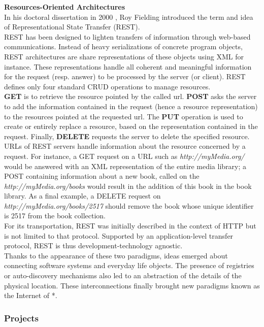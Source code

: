 {\bf Resources-Oriented Architectures}\\

In his doctoral dissertation in 2000 \cite{Fielding:2000}, Roy Fielding introduced the term and idea of Representational State Transfer (REST).\\
REST has been designed to lighten transfers of information through web-based communications. Instead of heavy serializations of concrete program objects, REST architectures are share representations of these objects using XML for instance. These representations handle all coherent and meaningful information for the request (resp. answer) to be processed by the server (or client). REST defines only four standard CRUD \cite{Yoder:1998} operations to manage resources.\\
{\bf GET} is to retrieve the resource pointed by the called url. {\bf POST} asks the server to add the information contained in the request (hence a resource representation) to the resources pointed at the requested url. The {\bf PUT} operation is used to create or entirely replace a resource, based on the representation contained in the request. Finally, {\bf DELETE} requests the server to delete the specified resource.\\
URLs of REST servers handle information about the resource concerned by a request. For instance, a GET request on a URL such as {\it http://myMedia.org/} would be answered with an XML representation of the entire media library; a POST containing information about a new book, called on the {\it http://myMedia.org/books} would result in the addition of this book in the book library. As a final example, a DELETE request on {\it http://myMedia.org/books/2517} should remove the book whose unique identifier is 2517 from the book collection.\\
For its transportation, REST was initially described in the context of HTTP but is not limited to that protocol. Supported by an application-level transfer protocol, REST is thus development-technology agnostic.\\


Thanks to the appearance of these two paradigms, ideas emerged about connecting software systems and everyday life objects. The presence of registries or auto-discovery mechanisms also led to an abstraction of the details of the physical location. These interconnections finally brought new paradigms known as the Internet of *. 

\subsubsection{Projects}
\label{subsec:osgi}

